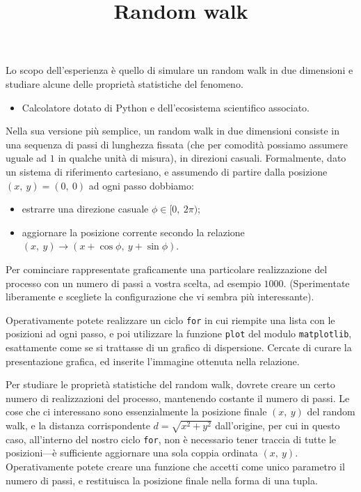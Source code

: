 \documentclass{lab1-article}
\title{Random walk}
\begin{document}
\begin{article}

\maketitle

\secsummary
Lo scopo dell'esperienza \`e quello di simulare un random walk in due dimensioni
e studiare alcune delle propriet\`a statistiche del fenomeno.

\secmaterials

\begin{itemize}
    \item Calcolatore dotato di Python e dell'ecosistema scientifico associato.
\end{itemize}

\secmeasurements

Nella sua versione pi\`u semplice, un random walk in due dimensioni consiste in
una sequenza di passi di lunghezza fissata (che per comodit\`a possiamo assumere
uguale ad $1$ in qualche unit\`a di misura), in direzioni casuali.
Formalmente, dato un sistema di riferimento cartesiano, e assumendo di partire
dalla posizione $(x,~y) = (0,~0)$ ad ogni passo dobbiamo:
\begin{itemize}
    \item estrarre una direzione casuale $\phi \in [0,~2\pi)$;
    \item aggiornare la posizione corrente secondo la relazione
        $(x,~y) \rightarrow (x + \cos\phi,~y + \sin\phi)$.
\end{itemize}



Per cominciare rappresentate graficamente una particolare realizzazione del processo
con un numero di passi a vostra scelta, ad esempio $1000$. (Sperimentate liberamente
e scegliete la configurazione che vi sembra pi\`u interessante).

Operativamente potete realizzare un ciclo \texttt{for} in cui riempite una lista
con le posizioni ad ogni passo, e poi utilizzare la funzione \texttt{plot} del modulo
\texttt{matplotlib}, esattamente come se si trattasse di un grafico di dispersione.
Cercate di curare la presentazione grafica, ed inserite l'immagine ottenuta nella
relazione.



Per studiare le propriet\`a statistiche del random walk, dovrete creare un certo
numero di realizzazioni del processo, mantenendo costante il numero di passi.
Le cose che ci interessano sono essenzialmente la posizione finale $(x,~y)$ del
random walk, e la distanza corrispondente $d = \sqrt{x^2 + y^2}$ dall'origine, per
cui in questo caso, all'interno del nostro ciclo \texttt{for}, non \`e necessario
tener traccia di tutte le posizioni---\`e sufficiente aggiornare una sola coppia
ordinata $(x,~y)$. Operativamente potete creare una funzione che accetti come unico
parametro il numero di passi, e restituisca la posizione finale nella forma di una
tupla.


\end{article}
\end{document}
